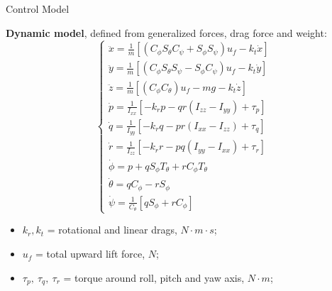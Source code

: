 \begin{frame}{Control Model}

\textbf{Dynamic model}, defined from generalized forces, drag force and weight:
\begin{equation*}
\begin{cases}
\ddot{x} = \frac{1}{m}[(C_{\phi}S_{\theta}C_{\psi} + S_{\phi}S_{\psi})u_f-k_t \dot{x}] \\
\ddot{y} = \frac{1}{m}[(C_{\phi}S_{\theta}S_{\psi} - S_{\phi}C_{\psi})u_f-k_t \dot{y}] \\
\ddot{z} = \frac{1}{m}[(C_{\phi}C_{\theta})u_f- mg - k_t \dot{z}] \\
\dot{p} = \frac{1}{I_{xx}}[-k_r p - qr(I_{zz}-I_{yy})+\tau_p]  \\
\dot{q} = \frac{1}{I_{yy}}[-k_r q - pr(I_{xx}-I_{zz})+\tau_q]  \\
\dot{r} = \frac{1}{I_{zz}}[-k_r r - pq(I_{yy}-I_{xx})+\tau_r]  \\
\dot{\phi} = p + q S_{\phi}T_{\theta} + r C_{\phi}T_{\theta} \\
\dot{\theta} = q C_{\phi} - rS_{\phi} \\
\dot{\psi} = \frac{1}{C_{\theta}}[qS_{\phi}+rC_{\phi}]
\end{cases}
\end{equation*}

\begin{itemize}
\item $ k_r, k_t $ = rotational and linear drags, $ N \cdot m \cdot s  $;
\item $ u_f $ = total upward lift force, $ N $;
\item $ \tau_p, \ \tau_q, \ \tau_r $ = torque around roll, pitch and yaw axis, $ N\cdot m $;
\end{itemize}

\end{frame}

